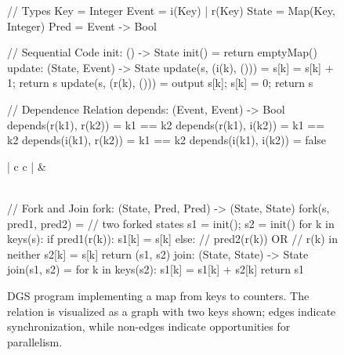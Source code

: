 \begin{figure}[t]
\centering \footnotesize{}
\begin{minipage}{0.38\columnwidth}
\begin{FluminaCode}


// Types
Key = Integer
Event = i(Key) | r(Key)
State = Map(Key, Integer)
Pred = Event -> Bool



// Sequential Code
init: () -> State
init() =
    return emptyMap()
update: (State, Event)
        -> State
update(s, (i(k), ())) =
    s[k] = s[k] + 1;
    return s
update(s, (r(k), ())) =
    output s[k];
    s[k] = 0;
    return s
\end{FluminaCode}
\end{minipage}
%
\begin{minipage}{0.6\columnwidth}
\begin{FluminaCode}
// Dependence Relation
depends: (Event, Event) -> Bool
depends(r(k1), r(k2)) = k1 == k2
depends(r(k1), i(k2)) = k1 == k2
depends(i(k1), r(k2)) = k1 == k2
depends(i(k1), i(k2)) = false
\end{FluminaCode}

\scriptsize{}
\centering
\begin{tabular}{ | c c | }
    \hline
  &  \\
     \\
    \hline
\end{tabular}

\begin{FluminaCode}
// Fork and Join
fork: (State, Pred, Pred)
        -> (State, State)
fork(s, pred1, pred2) =
    // two forked states
    s1 = init(); s2 = init()
    for k in keys(s):
        if pred1(r(k)):
            s1[k] = s[k]
        else:
            // pred2(r(k)) OR
            //   r(k) in neither
            s2[k] = s[k]
    return (s1, s2)
join: (State, State) -> State
join(s1, s2) =
    for k in keys(s2):
        s1[k] = s1[k] + s2[k]
    return s1
\end{FluminaCode}
\end{minipage}

\caption{
  DGS program implementing a map from keys to counters.
  The  relation is visualized as a graph with two keys shown; edges indicate synchronization, while non-edges indicate opportunities for parallelism.
}
\label{dgs:fig:key-value-store}
\end{figure}

